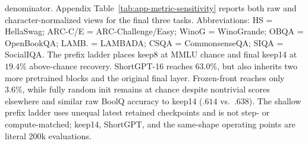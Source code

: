 \begin{table}[t]
{denominator. Appendix Table~\ref{tab:app-metric-sensitivity} reports both raw
and character-normalized views for the final three tasks. Abbreviations: HS = HellaSwag;
ARC-C/E = ARC-Challenge/Easy; WinoG = WinoGrande; OBQA = OpenBookQA; LAMB. =
LAMBADA; CSQA = CommonsenseQA; SIQA = SocialIQA.
The prefix ladder places keep8 at MMLU chance and final keep14 at $19.4\%$
above-chance recovery. ShortGPT-16 reaches $63.0\%$, but also inherits two more
pretrained blocks and the original final layer. Frozen-front reaches only
$3.6\%$, while fully random init remains at chance despite nontrivial scores
elsewhere and similar raw BoolQ accuracy to keep14 ($.614$ vs.\ $.638$).
The shallow prefix ladder uses unequal latest retained checkpoints and is not
step- or compute-matched; keep14, ShortGPT, and the same-shape operating points are
literal 200k evaluations.}
\label{tab:downstream}
\end{table}
